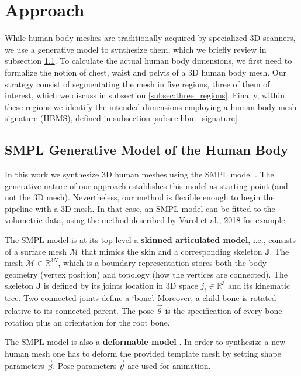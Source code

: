 \documentclass[runningheads, orivec]{llncs}
\begin{document}
\section{Approach}\label{sec:approach}
While human body 
meshes are traditionally acquired by specialized 3D scanners, we use a 
generative model to synthesize them, which we briefly review in 
subsection \ref{subsec:smpl_model}. To calculate the actual human body 
dimensions, we first need to formalize the 
notion of chest, waist and pelvis of a 3D human body mesh. Our strategy consist 
of segmentating the mesh in five regions, 
three of them of interest, which we 
discuss in subsection \ref{subsec:three_regions}. Finally, within these regions 
we identify the intended dimensions employing a human body mesh signature 
(HBMS), 
defined in subsection \ref{subsec:hbm_signature}.

\subsection{SMPL Generative Model of the Human Body}\label{subsec:smpl_model}
In this work we synthesize 3D human meshes using the SMPL
model \cite{Loper.2015}. The generative nature of our approach establishes this 
model as starting point (and not the 3D mesh). Nevertheless, our method is 
flexible enough to begin the pipeline with a 3D mesh. In that case, an SMPL 
model can be fitted to the volumetric data, using the method described by 
Varol et al., 2018 \cite{varol18_bodynet} for example.

The SMPL model is at its top level a \textbf{skinned articulated 
model}, i.e., 
consists of a 
surface mesh $\mathcal{M}$ that mimics the skin and a corresponding skeleton 
$\mathbf{J}$. The mesh $\mathcal{M} \in \mathbb{R}^{3N}$, which is a boundary 
representation stores 
both the body geometry (vertex position) and topology (how the vertices are 
connected). The skeleton $\mathbf{J}$ is defined by its joints location in 3D 
space $j_i \in \mathbb{R}^3$  and its kinematic tree. Two 
connected 
joints define a `bone'. Moreover, a child bone is rotated relative to 
its 
connected parent. The pose $\vec{\theta}$ is the specification of every bone 
rotation plus an orientation for the root bone.

The SMPL model is also a \textbf{deformable model} 
\cite{Terzopoulos:1987:EDM:37401.37427}. In order to 
synthesize a 
new human mesh one has to deform the provided template mesh by 
setting shape parameters $\vec{\beta}$. Pose parameters $\vec{\theta}$ are used 
for animation.
\end{document}
